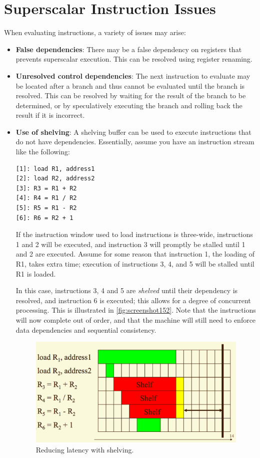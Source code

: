 \section{Superscalar Instruction Issues}
When evaluating instructions, a variety of issues may arise: \begin{itemize}
\item \textbf{False dependencies}: There may be a false dependency on registers that prevents superscalar execution. This can be resolved using register renaming.
\item \textbf{Unresolved control dependencies}: The next instruction to evaluate may be located after a branch and thus cannot be evaluated until the branch is resolved. This can be resolved by waiting for the result of the branch to be determined, or by speculatively executing the branch and rolling back the result if it is incorrect.
\item \textbf{Use of shelving}: A shelving buffer can be used to execute instructions that do not have dependencies. Essentially, assume you have an instruction stream like the following:
\begin{lstlisting}[language={}]
[1]: load R1, address1 
[2]: load R2, address2
[3]: R3 = R1 + R2
[4]: R4 = R1 / R2
[5]: R5 = R1 - R2
[6]: R6 = R2 + 1
\end{lstlisting}
If the instruction window used to load instructions is three-wide, instructions 1 and 2 will be executed, and instruction 3 will promptly be stalled until 1 and 2 are executed. Assume for some reason that instruction 1, the loading of R1, takes extra time; execution of instructions 3, 4, and 5 will be stalled until R1 is loaded. 

In this case, instructions 3, 4 and 5 are \textit{shelved} until their dependency is resolved, and instruction 6 is executed; this allows for a degree of concurrent processing. This is illustrated in \autoref{fig:screenshot152}. Note that the instructions will now complete out of order, and that the machine will still need to enforce data dependencies and sequential consistency.

\begin{figure}
\centering
\includegraphics[width=0.7\linewidth]{figures/screenshot152}
\caption{Reducing latency with shelving.}
\label{fig:screenshot152}
\end{figure}

\end{itemize}

